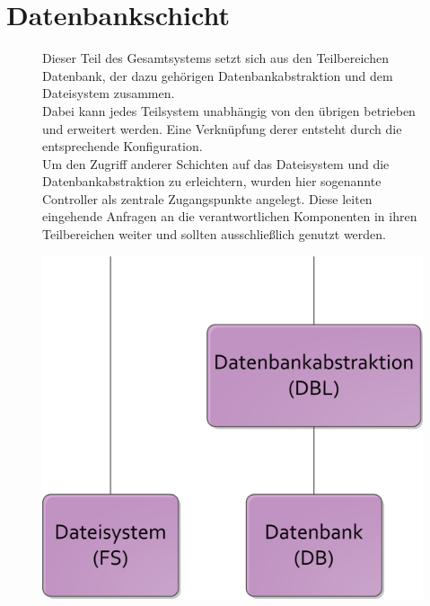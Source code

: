 \section{Datenbankschicht\label{Datenbankschicht}}
\begin{figure}[hptb]
  \begin{minipage}[b][7.5cm][t]{.5\linewidth}
Dieser Teil des Gesamtsystems setzt sich aus den Teilbereichen Datenbank, der dazu gehörigen Datenbankabstraktion und dem Dateisystem zusammen.\\

Dabei kann jedes Teilsystem unabhängig von den übrigen betrieben und erweitert werden. Eine Verknüpfung derer entsteht durch die entsprechende Konfiguration.\\

Um den Zugriff anderer Schichten auf das Dateisystem und die Daten\-bank\-abstraktion zu erleichtern, wurden hier sogenannte Controller als zentrale Zugangspunkte angelegt. Diese leiten eingehende Anfragen an die verantwortlichen Komponenten in ihren Teilbereichen weiter und sollten ausschließlich genutzt werden. 
  \end{minipage}
  \begin{minipage}[b]{.5\linewidth}
    \centering
\includegraphics[scale=0.5]{Images/DB-Schichten.png}
  \end{minipage}\hfill
\end{figure}

 

